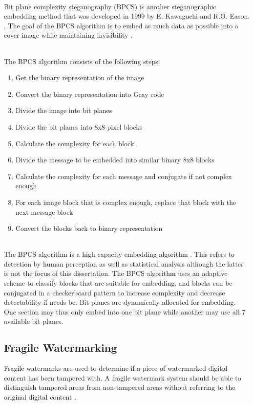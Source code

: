 \documentclass[12pt]{article}
\begin{document}
\hspace{0pt} \\
Bit plane complexity steganography (BPCS) is another steganographic embedding method that was developed in 1999 by E. Kawaguchi and R.O. Eason. \cite{kawaguchi1999principles}. 
The goal of the BPCS algorithm is to embed as much data as possible into a cover image while maintaining invisibility \cite{beaullieubpcs}.

\hspace{0pt} \\
The BPCS algorithm consists of the following steps:
\begin{enumerate}
  \item Get the binary representation of the image
  \item Convert the binary representation into Gray code
  \item Divide the image into bit planes
  \item Divide the bit planes into 8x8 pixel blocks
  \item Calculate the complexity for each block
  \item Divide the message to be embedded into similar binary 8x8 blocks
  \item Calculate the complexity for each message and conjugate if not complex enough
  \item For each image block that is complex enough, replace that block with the next message block
  \item Convert the blocks back to binary representation 
\end{enumerate}

\hspace{0pt} \\
The BPCS algorithm is a high capacity embedding algorithm \cite{beaullieubpcs}.
This refers to detection by human perception as well as statistical analysis although the latter is not the focus of this dissertation.
The BPCS algorithm uses an adaptive scheme to classify blocks that are suitable for embedding.
and blocks can be conjugated in a checkerboard pattern to increase complexity and decrease detectability if needs be.
Bit planes are dynamically allocated for embedding.
One section may thus only embed into one bit plane while another may use all 7 available bit planes.

\subsection{Fragile Watermarking}
\label{introFragWatermarking}
Fragile watermarks are used to determine if a piece of watermarked digital content has been tampered with. A fragile watermark system should be able to distinguish tampered areas from non-tampered areas without referring to the original digital content \cite{liu2007image}.
\end{document}
